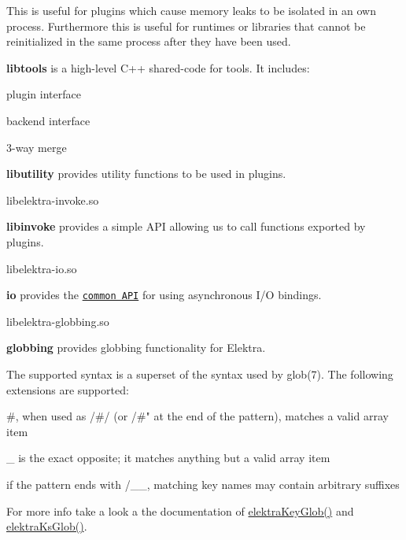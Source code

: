 This is useful for plugins which cause memory leaks to be isolated in an own process. Furthermore this is useful for runtimes or libraries that cannot be reinitialized in the same process after they have been used.

{\bfseries libtools} is a high-\/level C++ shared-\/code for tools. It includes\+:


\begin{DoxyItemize}
\item plugin interface
\item backend interface
\item 3-\/way merge
\end{DoxyItemize}

{\bfseries libutility} provides utility functions to be used in plugins.


\begin{DoxyCode}
libelektra-invoke.so
\end{DoxyCode}


{\bfseries libinvoke} provides a simple A\+PI allowing us to call functions exported by plugins.


\begin{DoxyCode}
libelektra-io.so
\end{DoxyCode}


{\bfseries io} provides the \href{https://doc.libelektra.org/api/current/html/group__kdbio.html}{\tt common A\+PI} for using asynchronous I/O bindings.


\begin{DoxyCode}
libelektra-globbing.so
\end{DoxyCode}


{\bfseries globbing} provides globbing functionality for Elektra.

The supported syntax is a superset of the syntax used by {\ttfamily glob(7)}. The following extensions are supported\+:


\begin{DoxyItemize}
\item {\ttfamily \#}, when used as {\ttfamily /\#/} (or {\ttfamily /\#"} at the end of the pattern), matches a valid array item
\item {\ttfamily \+\_\+} is the exact opposite; it matches anything but a valid array item
\item if the pattern ends with {\ttfamily /\+\_\+\+\_\+}, matching key names may contain arbitrary suffixes
\end{DoxyItemize}

For more info take a look a the documentation of {\ttfamily \hyperlink{globbing_8c_ad7700821df72fc0fc3bfc336e4368d29}{elektra\+Key\+Glob()}} and {\ttfamily \hyperlink{globbing_8c_a85baa9c79325ad1bf08e95cd82a4daf6}{elektra\+Ks\+Glob()}}. 